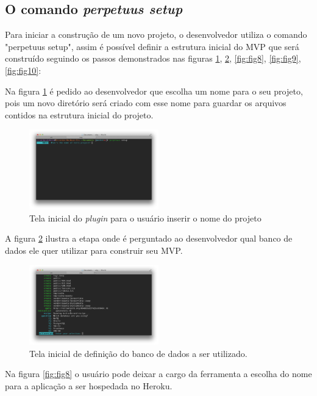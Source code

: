 \subsection{O comando \emph{perpetuus setup}}

Para iniciar a constru\c{c}\~ao de um novo projeto, o desenvolvedor utiliza o comando "perpetuus setup", assim \'e poss\'ivel definir a estrutura inicial do MVP que ser\'a constru\'ido seguindo os passos demonstrados nas figuras \ref{fig:fig6}, \ref{fig:fig7}, \ref{fig:fig8}, \ref{fig:fig9}, \ref{fig:fig10}:

\pagebreak

Na figura \ref{fig:fig6} \'e pedido ao desenvolvedor que escolha um nome para o seu projeto, pois um novo diret\'orio ser\'a criado com esse nome para guardar os arquivos contidos na estrutura inicial do projeto.

\begin{figure}[h]
  \centering
  \includegraphics[width=0.5\textwidth]{./fig/setup1}
  \caption{Tela inicial do \emph{plugin} para o usu\'ario inserir o nome do projeto}
  \label{fig:fig6}
\end{figure}

A figura \ref{fig:fig7} ilustra a etapa onde \'e perguntado ao desenvolvedor qual banco de dados ele quer utilizar para construir seu MVP.

\begin{figure}[h]
  \centering
  \includegraphics[width=0.5\textwidth]{./fig/setup2}
  \caption{Tela inicial de defini\c{c}\~ao do banco de dados a ser utilizado.}
  \label{fig:fig7}
\end{figure}

Na figura \ref{fig:fig8} o usu\'ario pode deixar a cargo da ferramenta a escolha do nome para a aplica\c{c}\~ao a ser hospedada no Heroku.

